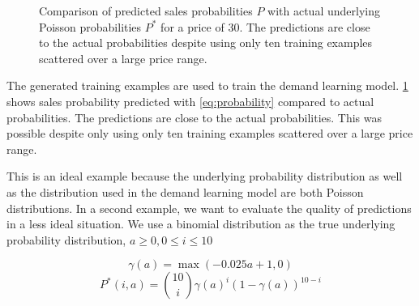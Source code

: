 \begin{figure}[t]
	\caption[Comparison of Predicted Probabilites with Underlying Poisson Probabilities]{Comparison of predicted sales probabilities $P$ with actual underlying Poisson probabilities $P^*$ for a price of 30. The predictions are close to the actual probabilities despite using only ten training examples scattered over a large price range.}
	\label{fig:probs_poisson}
\end{figure}

The generated training examples are used to train the demand learning model.
\cref{fig:probs_poisson} shows sales probability predicted with \cref{eq:probability} compared to actual probabilities.
The predictions are close to the actual probabilities.
This was possible despite only using only ten training examples scattered over a large price range.

This is an ideal example because the underlying probability distribution as well as the distribution used in the demand learning model are both Poisson distributions.
In a second example, we want to evaluate the quality of predictions in a less ideal situation.
We use a binomial distribution as the true underlying probability distribution, $a \geq 0, 0 \leq i \leq 10$

$$
\gamma(a) = \max(-0.025 a + 1, 0)
$$
$$
P^*(i, a) = \binom{10}{i} \gamma(a)^i (1 - \gamma(a))^{10-i}
$$

